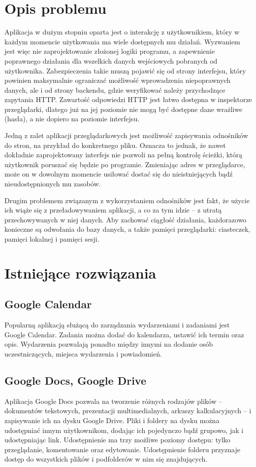 \documentclass[a4paper,twoside,12pt]{book}
\begin{document}
\section{Opis problemu}
Aplikacja w dużym stopniu oparta jest o interakcję z użytkownikiem, który w każdym momencie użytkowania ma wiele dostępnych mu działań. Wyzwaniem jest więc nie zaprojektowanie złożonej logiki programu, a zapewnienie poprawnego działania dla wszelkich danych wejściowych pobranych od użytkownika. Zabezpieczenia takie muszą pojawić się od strony interfejsu, który powinien maksymalnie ograniczać możliwość wprowadzenia niepoprawnych danych, ale i od strony backendu, gdzie weryfikować należy przychodzące zapytania HTTP. Zawartość odpowiedzi HTTP jest łatwo dostępna w inspektorze przeglądarki, dlatego już na jej poziomie nie mogą być dostępne dane wrażliwe (hasła), a nie dopiero na poziomie interfejsu.

Jedną z zalet aplikacji przeglądarkowych jest możliwość zapisywania odnośników do stron, na przykład do konkretnego pliku. Oznacza to jednak, że nawet dokładnie zaprojektowany interfejs nie pozwoli na pełną kontrolę ścieżki, którą użytkownik poruszać się będzie po programie. Zmieniając adres w przeglądarce, może on w dowolnym momencie usiłować dostać się do nieistniejących bądź nieudostępnionych mu zasobów.

Drugim problemem związanym z wykorzystaniem odnośników jest fakt, że użycie ich wiąże się z przeładowywaniem aplikacji, a co za tym idzie -- z utratą przechowywanych w niej danych. Aby zachować ciągłość działania, każdorazowo konieczne są odwołania do bazy danych, a także pamięci przeglądarki: ciasteczek, pamięci lokalnej i pamięci sesji.

\section{Istniejące rozwiązania}
\subsection{Google Calendar}
Popularną aplikacją służącą do zarządzania wydarzeniami i zadaniami jest Google Calendar. Zadania można dodać do kalendarza, ustawić ich termin oraz opis. Wydarzenia pozwalają ponadto między innymi na dodanie osób uczestniczących, miejsca wydarzenia i powiadomień.
\subsection{Google Docs, Google Drive}
Aplikacja Google Docs pozwala na tworzenie różnych rodzajów plików -- dokumentów tekstowych, prezentacji multimedialnych, arkuszy kalkulacyjnych -- i zapisywanie ich na dysku Google Drive. Pliki i foldery na dysku można udostępniać innym użytkownikom, dodając ich pojedynczo bądź grupowo, jak i udostępniając link. Udostępnienie ma trzy możliwe poziomy dostępu: tylko przeglądanie, komentowanie oraz edytowanie. Udostępnienie folderu przyznaje dostęp do wszystkich plików i podfolderów w nim się znajdujących.
\end{document}
